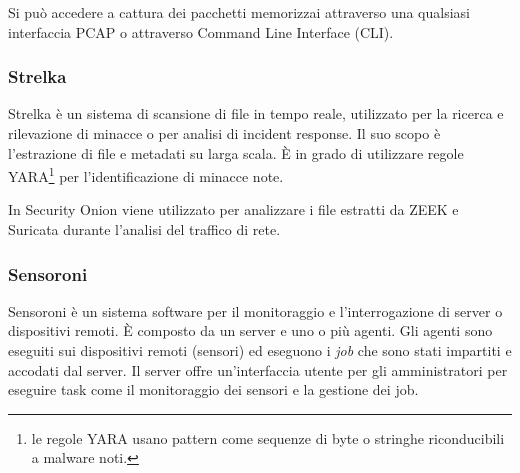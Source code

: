 Si può accedere a cattura dei pacchetti memorizzai attraverso una qualsiasi interfaccia PCAP o attraverso Command Line Interface (CLI).

\subsubsection*{Strelka}
Strelka \cite{strelka} è un sistema di scansione di file in tempo reale, utilizzato per la ricerca e rilevazione di minacce o per analisi di incident response. Il suo scopo è l'estrazione di file e metadati su larga scala. È in grado di utilizzare regole YARA\footnote{le regole YARA usano pattern  come sequenze  di byte  o stringhe riconducibili  a malware noti.} per l'identificazione di minacce note.

In Security Onion viene utilizzato per analizzare i file estratti da ZEEK e Suricata durante l'analisi del traffico di rete.

\subsubsection*{Sensoroni}
Sensoroni \cite{sensoroni} è un sistema software per il monitoraggio e l'interrogazione di server o dispositivi remoti.
È composto da un server e uno o più agenti.
Gli agenti sono  eseguiti sui dispositivi remoti (sensori) ed eseguono i \textit{job} che sono stati impartiti e accodati dal server. 
Il server offre un'interfaccia utente per gli amministratori per eseguire task come il monitoraggio dei sensori e la gestione dei job.

